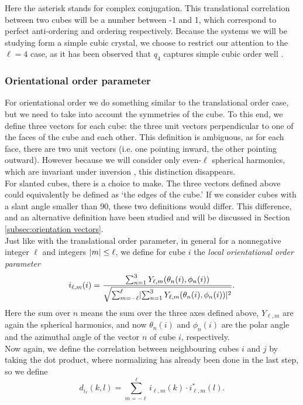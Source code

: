 \documentclass[thesis]{subfiles}
\begin{document}
Here the asterisk stands for complex conjugation. This translational correlation between two cubes will be a number between -1 and 1, which correspond to perfect anti-ordering and ordering respectively. Because the systems we will be studying form a simple cubic crystal, we choose to restrict our attention to the $\ell = 4$ case, as it has been observed that $q_4$ captures simple cubic order well \cite{steinhardt1983bond,mickel2013shortcomings}.

\subsubsection{Orientational order parameter} \label{subsubsec:orient order param}

For orientational order we do something similar to the translational order case, but we need to take into account the symmetries of the cube. To this end, we define three vectors for each cube: the three unit vectors perpendicular to one of the faces of the cube and each other. This definition is ambiguous, as for each face, there are two unit vectors (i.e. one pointing inward, the other pointing outward). However because we will consider only even-$\ell$ spherical harmonics, which are invariant under inversion \cite{steinhardt1983bond}, this distinction disappears.\\
For slanted cubes, there is a choice to make. The three vectors defined above could equivalently be defined as `the edges of the cube.' If we consider cubes with a slant angle smaller than 90\degr, these two definitions would differ. This difference, and an alternative definition have been studied and will be discussed in Section \ref{subsec:orientation vectors}.
\\
Just like with the translational order parameter, in general for a nonnegative integer $\ell$ and integers $ \lvert m\rvert \leq \ell$, we define for cube $i$ the \emph{local orientational order parameter}
\begin{equation}
i_{\ell, m}(i) = \frac{\sum_{n = 1}^3 Y_{\ell, m}(\theta_n(i), \phi_n(i))}{\sqrt{\sum_{m = -\ell}^\ell \lvert\sum_{n = 1}^3 Y_{\ell, m}(\theta_n(i), \phi_n(i))\rvert^2}}.
\end{equation}
Here the sum over $n$ means the sum over the three axes defined above, $Y_{\ell, m}$ are again the spherical harmonics, and now $\theta_n(i)$ and $\phi_n(i)$ are the polar angle and the azimuthal angle of the vector $n$ of cube $i$, respectively.\\
Now again, we define the correlation between neighbouring cubes $i$ and $j$ by taking the dot product, where normalizing has already been done in the last step, so we define
\begin{equation}
d_{i_\ell}(k,l) = \sum_{m = -\ell}^\ell i_{\ell, m}(k) \cdot i^*_{\ell, m}(l).
\end{equation}
\end{document}
